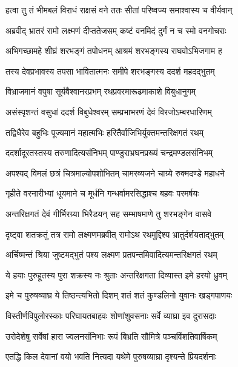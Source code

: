 
\twolineshloka
{हत्वा तु तं भीमबलं विराधं राक्षसं वने}
{ततः सीतां परिष्वज्य समाश्वास्य च वीर्यवान्} %

\twolineshloka
{अब्रवीद् भ्रातरं रामो लक्ष्मणं दीप्ततेजसम्}
{कष्टं वनमिदं दुर्गं न च स्मो वनगोचराः} %

\twolineshloka
{अभिगच्छामहे शीघ्रं शरभङ्गं तपोधनम्}
{आश्रमं शरभङ्गस्य राघवोऽभिजगाम ह} %

\twolineshloka
{तस्य देवप्रभावस्य तपसा भावितात्मनः}
{समीपे शरभङ्गस्य ददर्श महदद्भुतम्} %

\twolineshloka
{विभ्राजमानं वपुषा सूर्यवैश्वानरप्रभम्}
{रथप्रवरमारूढमाकाशे विबुधानुगम्} %

\twolineshloka
{असंस्पृशन्तं वसुधां ददर्श विबुधेश्वरम्}
{सम्प्रभाभरणं देवं विरजोऽम्बरधारिणम्} %

\twolineshloka
{तद्विधैरेव बहुभिः पूज्यमानं महात्मभिः}
{हरितैर्वाजिभिर्युक्तमन्तरिक्षगतं रथम्} %

\twolineshloka
{ददर्शादूरतस्तस्य तरुणादित्यसंनिभम्}
{पाण्डुराभ्रघनप्रख्यं चन्द्रमण्डलसंनिभम्} %

\twolineshloka
{अपश्यद् विमलं छत्रं चित्रमाल्योपशोभितम्}
{चामरव्यजने चाग्र्ये रुक्मदण्डे महाधने} %

\twolineshloka
{गृहीते वरनारीभ्यां धूयमाने च मूर्धनि}
{गन्धर्वामरसिद्धाश्च बहवः परमर्षयः} %

\twolineshloka
{अन्तरिक्षगतं देवं गीर्भिरग्र्या भिरैडयन्}
{सह सम्भाषमाणे तु शरभङ्गेन वासवे} %

\twolineshloka
{दृष्ट्वा शतक्रतुं तत्र रामो लक्ष्मणमब्रवीत्}
{रामोऽथ रथमुद्दिश्य भ्रातुर्दर्शयताद्भुतम्} %

\twolineshloka
{अर्चिष्मन्तं श्रिया जुष्टमद्भुतं पश्य लक्ष्मण}
{प्रतपन्तमिवादित्यमन्तरिक्षगतं रथम्} %

\twolineshloka
{ये हयाः पुरुहूतस्य पुरा शक्रस्य नः श्रुताः}
{अन्तरिक्षगता दिव्यास्त इमे हरयो ध्रुवम्} %

\twolineshloka
{इमे च पुरुषव्याघ्र ये तिष्ठन्त्यभितो दिशम्}
{शतं शतं कुण्डलिनो युवानः खड्गपाणयः} %

\twolineshloka
{विस्तीर्णविपुलोरस्काः परिघायतबाहवः}
{शोणांशुवसनाः सर्वे व्याघ्रा इव दुरासदाः} %

\twolineshloka
{उरोदेशेषु सर्वेषां हारा ज्वलनसंनिभाः}
{रूपं बिभ्रति सौमित्रे पञ्चविंशतिवार्षिकम्} %

\twolineshloka
{एतद्धि किल देवानां वयो भवति नित्यदा}
{यथेमे पुरुषव्याघ्रा दृश्यन्ते प्रियदर्शनाः} %

